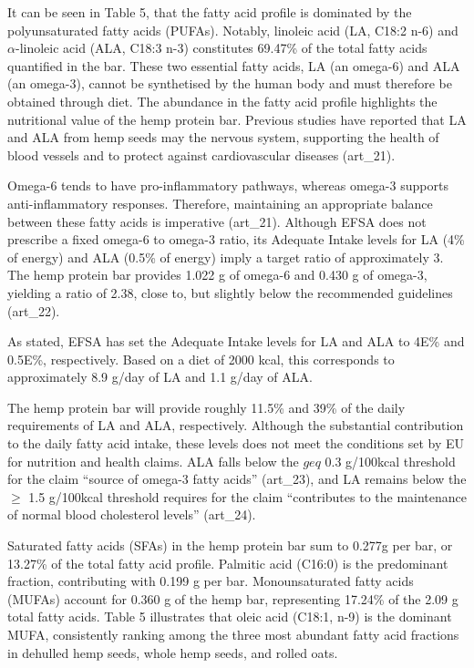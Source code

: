 \vspace{1em}
It can be seen in Table 5, that the fatty acid profile is dominated by the polyunsaturated fatty acids (PUFAs). Notably, linoleic acid (LA, C18:2 n-6) and $\alpha$-linoleic acid (ALA, C18:3 n-3) constitutes 69.47\% of the total fatty acids quantified in the bar. These two essential fatty acids, LA (an omega-6) and ALA (an omega-3), cannot be synthetised by the human body and must therefore be obtained through diet. The abundance in the fatty acid profile highlights the nutritional value of the hemp protein bar. Previous studies have reported that LA and ALA from hemp seeds may the nervous system, supporting the health of blood vessels and to protect against cardiovascular diseases (art\_21). 

\vspace{1em}
Omega-6 tends to have pro-inflammatory pathways, whereas omega-3 supports anti-inflammatory responses. Therefore, maintaining an appropriate balance between these fatty acids is imperative (art\_21). Although EFSA does not prescribe a fixed omega-6 to omega-3 ratio, its Adequate Intake levels for LA (4\% of energy) and ALA (0.5\% of energy) imply a target ratio of approximately 3. The hemp protein bar provides 1.022 g of omega-6 and 0.430 g of omega-3, yielding a ratio of 2.38, close to, but slightly below the recommended guidelines (art\_22). 

\vspace{1em}
As stated, EFSA has set the Adequate Intake levels for LA and ALA to 4E\% and 0.5E\%, respectively. Based on a diet of 2000 kcal, this corresponds to approximately 8.9 g/day of LA and 1.1 g/day of ALA. 

\vspace{1em}
The hemp protein bar will provide roughly 11.5\% and 39\% of the daily requirements of LA and ALA, respectively. Although the substantial contribution to the daily fatty acid intake, these levels does not meet the conditions set by EU for nutrition and health claims. ALA falls below the $geq$ 0.3 g/100kcal threshold for the claim “source of omega-3 fatty acids” (art\_23), and LA remains below the $\geq$ 1.5 g/100kcal threshold requires for the claim “contributes to the maintenance of normal blood cholesterol levels” (art\_24).

\vspace{1em}
Saturated fatty acids (SFAs) in the hemp protein bar sum to 0.277g per bar, or 13.27\% of the total fatty acid profile. Palmitic acid (C16:0) is the predominant fraction, contributing with 0.199 g per bar. 
Monounsaturated fatty acids (MUFAs) account for 0.360 g of the hemp bar, representing 17.24\% of the 2.09 g total fatty acids. Table 5 illustrates that oleic acid (C18:1, n-9) is the dominant MUFA, consistently ranking among the three most abundant fatty acid fractions in dehulled hemp seeds, whole hemp seeds, and rolled oats. 


